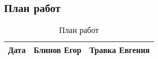 \documentclass[./intro.tex]{subfiles}
\begin{document}
\subsection{План работ}
\begin{table}[h]
    \caption{План работ}
    \label{table:2}
    \begin{center}
        \begin{tabular}{|c|c|c|}
            \hline
            Дата & Блинов Егор & Травка Евгения\\
            \hline
        \end{tabular}    
    \end{center}
\end{table}
\end{document}

